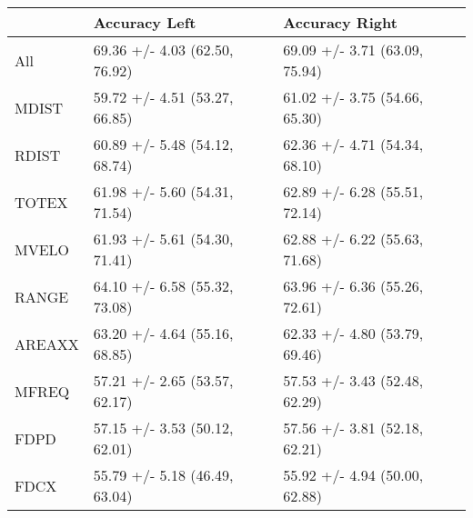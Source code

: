 \begin{tabular}{lll}
\toprule
{} &                  Accuracy Left &                 Accuracy Right \\
\midrule
All    &  69.36 +/- 4.03 (62.50, 76.92) &  69.09 +/- 3.71 (63.09, 75.94) \\
MDIST  &  59.72 +/- 4.51 (53.27, 66.85) &  61.02 +/- 3.75 (54.66, 65.30) \\
RDIST  &  60.89 +/- 5.48 (54.12, 68.74) &  62.36 +/- 4.71 (54.34, 68.10) \\
TOTEX  &  61.98 +/- 5.60 (54.31, 71.54) &  62.89 +/- 6.28 (55.51, 72.14) \\
MVELO  &  61.93 +/- 5.61 (54.30, 71.41) &  62.88 +/- 6.22 (55.63, 71.68) \\
RANGE  &  64.10 +/- 6.58 (55.32, 73.08) &  63.96 +/- 6.36 (55.26, 72.61) \\
AREAXX &  63.20 +/- 4.64 (55.16, 68.85) &  62.33 +/- 4.80 (53.79, 69.46) \\
MFREQ  &  57.21 +/- 2.65 (53.57, 62.17) &  57.53 +/- 3.43 (52.48, 62.29) \\
FDPD   &  57.15 +/- 3.53 (50.12, 62.01) &  57.56 +/- 3.81 (52.18, 62.21) \\
FDCX   &  55.79 +/- 5.18 (46.49, 63.04) &  55.92 +/- 4.94 (50.00, 62.88) \\
\bottomrule
\end{tabular}
